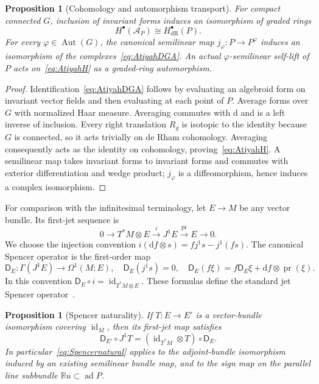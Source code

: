 \documentclass[11pt]{amsart}
\newcommand{\dd}{\mathrm d}
\newcommand{\R}{\mathbb R}
\newcommand{\id}{\operatorname{id}}
\theoremstyle{plain}
\newtheorem{proposition}[theorem]{Proposition}
\theoremstyle{definition}
\theoremstyle{remark}
\begin{document}
\begin{proposition}[Cohomology and automorphism transport]\label{prop:Atiyahcohomology}
For compact connected $G$, inclusion of invariant forms induces an isomorphism of graded rings
\begin{equation}\label{eq:AtiyahH}
 H^\bullet(\mathcal A_P)\cong H^\bullet_{\mathrm{dR}}(P).
\end{equation}
For every $\varphi\in\operatorname{Aut}(G)$, the canonical semilinear map $j_\varphi:P\to P^\varphi$ induces an isomorphism of the complexes~\eqref{eq:AtiyahDGA}.  An actual $\varphi$-semilinear self-lift of $P$ acts on~\eqref{eq:AtiyahH} as a graded-ring automorphism.
\end{proposition}

\begin{proof}
Identification~\eqref{eq:AtiyahDGA} follows by evaluating an algebroid form on invariant vector fields and then evaluating at each point of $P$.  Average forms over $G$ with normalized Haar measure.  Averaging commutes with $\dd$ and is a left inverse of inclusion.  Every right translation $R_g$ is isotopic to the identity because $G$ is connected, so it acts trivially on de Rham cohomology.  Averaging consequently acts as the identity on cohomology, proving~\eqref{eq:AtiyahH}.  A semilinear map takes invariant forms to invariant forms and commutes with exterior differentiation and wedge product; $j_\varphi$ is a diffeomorphism, hence induces a complex isomorphism.
\end{proof}

For comparison with the infinitesimal terminology, let $E\to M$ be any vector bundle.  Its first-jet sequence is
\begin{equation}\label{eq:jetseq}
0\longrightarrow T^*M\otimes E\xrightarrow{\ i\ }J^1E
 \xrightarrow{\operatorname{pr}}E\longrightarrow0.
\end{equation}
We choose the injection convention $i(\dd f\otimes s)=f j^1s-j^1(fs)$.  The canonical Spencer operator is the first-order map
\begin{equation}\label{eq:Spencer}
 \mathsf D_E:\Gamma(J^1E)\longrightarrow\Omega^1(M;E),
 \quad \mathsf D_E(j^1s)=0,
 \quad \mathsf D_E(f\xi)=f\mathsf D_E\xi+\dd f\otimes\operatorname{pr}(\xi).
\end{equation}
In this convention $\mathsf D_E\circ i=\id_{T^*M\otimes E}$.  These formulas define the standard jet Spencer operator~\cite{Spencer,CSS}.

\begin{proposition}[Spencer naturality]\label{prop:Spencernatural}
If $T:E\to E'$ is a vector-bundle isomorphism covering $\id_M$, then its first-jet map satisfies
\begin{equation}\label{eq:Spencernatural}
 \mathsf D_{E'}\circ J^1T=(\id_{T^*M}\otimes T)\circ\mathsf D_E.
\end{equation}
In particular~\eqref{eq:Spencernatural} applies to the adjoint-bundle isomorphism induced by an existing semilinear bundle map, and to the sign map on the parallel line subbundle $\R u\subset\operatorname{ad}P$.
\end{proposition}
\end{document}
